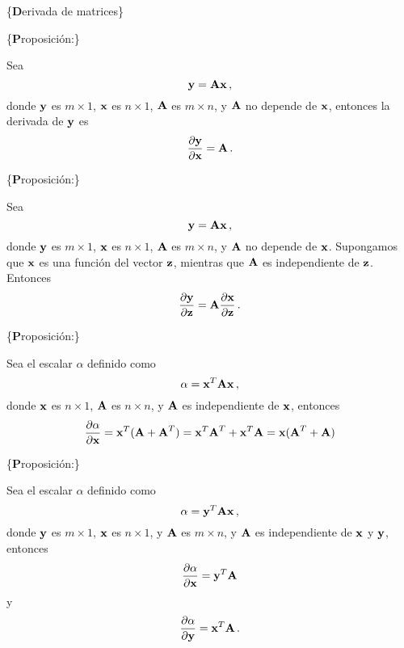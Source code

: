 \documentclass[
]{agujournal2019}
\begin{document}
\vspace{0.5cm}

\{\noindent \textbf Derivada de matrices\}

\vspace{0.5cm}

\{\noindent \textbf Proposición:\}

\noindent Sea \[{\textbf y}={\textbf A}{\textbf x}\,,\] donde
\({\textbf y}\) es \(m\times 1\), \({\textbf x}\) es \(n\times 1\),
\({\textbf A}\) es \(m\times n\), y \({\textbf A}\) no depende de
\({\textbf x}\), entonces la derivada de \({\textbf y}\) es
\[\frac{\partial{\textbf y}}{\partial{\textbf x}}={\textbf A}\,.\]

\vspace{0.5cm}

\{\noindent \textbf Proposición:\}

Sea \[{\textbf y}={\textbf A}{\textbf x}\,,\] donde \({\textbf y}\) es
\(m\times 1\), \({\textbf x}\) es \(n\times 1\), \({\textbf A}\) es
\(m\times n\), y \({\textbf A}\) no depende de \({\textbf x}\).
Supongamos que \({\textbf x}\) es una función del vector
\({\textbf z}\), mientras que \({\textbf A}\) es independiente de
\({\textbf z}\). Entonces
\[\frac{\partial{\textbf y}}{\partial{\textbf z}}={\textbf A}\frac{\partial{\textbf x}}{\partial{\textbf z}}\,.\]

\vspace{0.5cm}

\{\noindent \textbf Proposición:\}

\noindent Sea el escalar \(\alpha\) definido como
\[\alpha={\textbf x}^T{\textbf A}{\textbf x}\,,\] donde \({\textbf x}\)
es \(n\times 1\), \({\textbf A}\) es \(n\times n\), y \({\textbf A}\) es
independiente de \({\textbf x}\), entonces
\[\frac{\partial{\alpha}}{\partial{{\textbf x}}}={\textbf x}^T({\textbf A}+{\textbf A}^T)={\textbf x}^T{\textbf A}^T + {\textbf x}^T{\textbf A}={\textbf x}({\textbf A}^T+{\textbf A})\]

\vspace{0.5cm}

\{\noindent \textbf Proposición:\}

\noindent Sea el escalar \(\alpha\) definido como
\[\alpha={\textbf y}^T{\textbf A}{\textbf x}\,,\] donde \({\textbf y}\)
es \(m\times 1\), \({\textbf x}\) es \(n\times 1\), y \({\textbf A}\) es
\(m\times n\), y \({\textbf A}\) es independiente de \({\textbf x}\) y
\({\textbf y}\), entonces
\[\frac{\partial{\alpha}}{\partial{{\textbf x}}}={\textbf y}^T{\textbf A}\]
y
\[\frac{\partial{\alpha}}{\partial{{\textbf y}}}={\textbf x}^T{\textbf A}\,.\]
\end{document}
